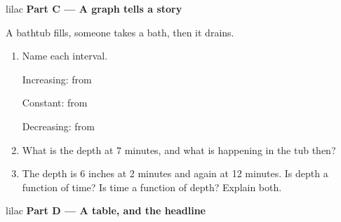 \documentclass[10pt]{article}
\begin{document}
\begin{headlinebox}{lilac}
\textbf{\color{plum}Part C --- A graph tells a story}
\end{headlinebox}

\begin{minipage}[t]{0.47\linewidth}
\vspace{0pt}
\centering
{}

\small A bathtub fills, someone takes a bath, then it drains.
\end{minipage}\hfill
\begin{minipage}[t]{0.5\linewidth}
\vspace{0pt}
\begin{enumerate}[leftmargin=1.9em, itemsep=8pt, start=8]
\item Name each interval.

      Increasing: from \blank{2.8cm}

      Constant: from \blank{2.8cm}

      Decreasing: from \blank{2.8cm}

\item What is the depth at 7 minutes, and what is happening in the tub then?
      \writespace{1.4cm}{}

\item The depth is 6 inches at 2 minutes and again at 12 minutes. Is depth a function of time?
      Is time a function of depth? Explain both.
      \writespace{2.3cm}{}
\end{enumerate}
\end{minipage}

\vspace{0.1in}

\begin{headlinebox}{lilac}
\textbf{\color{plum}Part D --- A table, and the headline}
\end{headlinebox}
\end{document}
